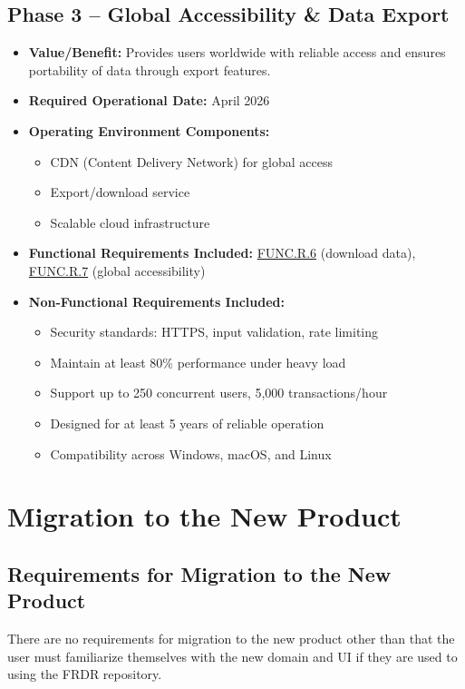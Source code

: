\documentclass[12pt]{article}
\begin{document}
\subsection*{Phase 3 -- Global Accessibility \& Data Export}
\begin{itemize}
    \item \textbf{Value/Benefit:} Provides users worldwide with reliable access and ensures portability of data through export features.
    \item \textbf{Required Operational Date:} April 2026
    \item \textbf{Operating Environment Components:}
    \begin{itemize}
        \item CDN (Content Delivery Network) for global access
        \item Export/download service
        \item Scalable cloud infrastructure
    \end{itemize}
    \item \textbf{Functional Requirements Included:} \hyperref[req:func.r.6]{FUNC.R.6} (download data), \hyperref[req:func.r.7]{FUNC.R.7} (global accessibility)
    \item \textbf{Non-Functional Requirements Included:}
    \begin{itemize}
        \item Security standards: HTTPS, input validation, rate limiting
        \item Maintain at least 80\% performance under heavy load
        \item Support up to 250 concurrent users, 5,000 transactions/hour
        \item Designed for at least 5 years of reliable operation
        \item Compatibility across Windows, macOS, and Linux
    \end{itemize}
\end{itemize}


\section{Migration to the New Product}
\subsection{Requirements for Migration to the New Product}

\par{There are no requirements for migration to the new product other than that the user must familiarize themselves with the new domain and UI if they are used to using the FRDR repository.}
\end{document}
